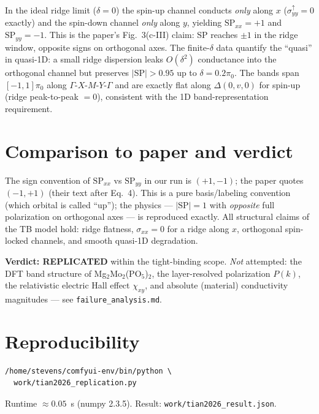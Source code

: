 \documentclass[aps,prl,twocolumn,superscriptaddress,floatfix]{revtex4-2}
\begin{document}
In the ideal ridge limit ($\delta=0$) the spin-up channel conducts
\emph{only} along $x$ ($\sigma_{yy}^\uparrow=0$ exactly) and the spin-down
channel \emph{only} along $y$, yielding $\mathrm{SP}_{xx}=+1$ and
$\mathrm{SP}_{yy}=-1$. This is the paper's Fig.~3(c-III) claim: SP reaches
$\pm1$ in the ridge window, opposite signs on orthogonal axes. The finite-$\delta$
data quantify the ``quasi'' in quasi-1D: a small ridge dispersion leaks
$O(\delta^2)$ conductance into the orthogonal channel but preserves $|\mathrm{SP}|>0.95$
up to $\delta=0.2\pi_0$. The bands span $[-1,1]\pi_0$ along
$\Gamma$-$X$-$M$-$Y$-$\Gamma$ and are exactly flat along $\Delta(0,v,0)$ for
spin-up (ridge peak-to-peak $=0$), consistent with the 1D band-representation
requirement.

\section{Comparison to paper and verdict}
The sign convention of $\mathrm{SP}_{xx}$ vs $\mathrm{SP}_{yy}$ in our run is
$(+1,-1)$; the paper quotes $(-1,+1)$ (their text after Eq.~4). This is a pure
basis/labeling convention (which orbital is called ``up''); the physics ---
$|\mathrm{SP}|=1$ with \emph{opposite} full polarization on orthogonal axes ---
is reproduced exactly. All structural claims of the TB model hold: ridge
flatness, $\sigma_{xx}=0$ for a ridge along $x$, orthogonal spin-locked
channels, and smooth quasi-1D degradation.

\textbf{Verdict: REPLICATED} within the tight-binding scope.
\emph{Not} attempted: the DFT band structure of Mg$_2$Mo$_2$(PO$_5$)$_2$, the
layer-resolved polarization $P(k)$, the relativistic electric Hall effect
$\chi_{xy}$, and absolute (material) conductivity magnitudes --- see
\texttt{failure\_analysis.md}.

\section{Reproducibility}
\begin{verbatim}
/home/stevens/comfyui-env/bin/python \
  work/tian2026_replication.py
\end{verbatim}
Runtime $\approx0.05$~s (numpy 2.3.5). Result: \texttt{work/tian2026\_result.json}.
\end{document}

